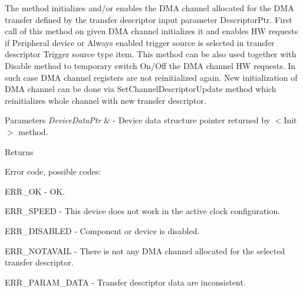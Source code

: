 The method initializes and/or enables the D\-M\-A channel allocated for the D\-M\-A transfer defined by the transfer descriptor input parameter Descriptor\-Ptr. First call of this method on given D\-M\-A channel initializes it and enables H\-W requests if Peripheral device or Always enabled trigger source is selected in transfer descriptor Trigger source type item. This method can be also used together with Disable method to temporary switch On/\-Off the D\-M\-A channel H\-W requests. In such case D\-M\-A channel registers are not reinitialized again. New initialization of D\-M\-A channel can be done via Set\-Channel\-Descriptor\-Update method which reinitializes whole channel with new transfer descriptor. 


\begin{DoxyParams}{Parameters}
{\em Device\-Data\-Ptr} & -\/ Device data structure pointer returned by $<$\-Init$>$ method. \\
\hline
\end{DoxyParams}
\begin{DoxyReturn}{Returns}

\begin{DoxyItemize}
\item Error code, possible codes\-:
\begin{DoxyItemize}
\item E\-R\-R\-\_\-\-O\-K -\/ O\-K.
\item E\-R\-R\-\_\-\-S\-P\-E\-E\-D -\/ This device does not work in the active clock configuration.
\item E\-R\-R\-\_\-\-D\-I\-S\-A\-B\-L\-E\-D -\/ Component or device is disabled.
\item E\-R\-R\-\_\-\-N\-O\-T\-A\-V\-A\-I\-L -\/ There is not any D\-M\-A channel allocated for the selected transfer descriptor.
\item E\-R\-R\-\_\-\-P\-A\-R\-A\-M\-\_\-\-D\-A\-T\-A -\/ Transfer descriptor data are inconsistent. 
\end{DoxyItemize}
\end{DoxyItemize}
\end{DoxyReturn}
